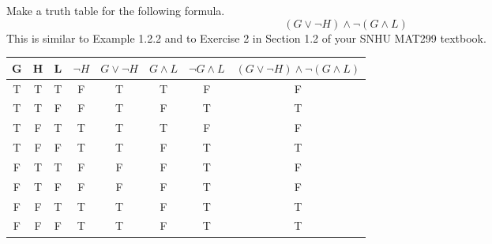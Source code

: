 \begin{prob}
Make a truth table for the following formula.
$$ (G \vee \neg H) \wedge \neg(G \wedge L) $$
This is similar to Example 1.2.2 and to Exercise 2 in Section 1.2 of your SNHU MAT299 textbook.
\begin{center}
 \begin{tabular}{|c|c|c|c|c|c|c|c|} 
 \hline
 G & H & L & $\neg H$ & $G \vee \neg H$ & $G \wedge L$ & $\neg G \wedge L$ & $ (G \vee \neg H) \wedge \neg(G \wedge L) $ \\ 
 \hline
T & T & T & F & T & T & F & F\\
T & T & F & F & T & F & T & T\\
T & F & T & T & T & T & F & F\\
T & F & F & T & T & F & T & T\\
F & T & T & F & F & F & T & F\\
F & T & F & F & F & F & T & F\\
F & F & T & T & T & F & T & T\\
F & F & F & T & T & F & T & T\\
 \hline
\end{tabular}
\end{center}
\end{prob}
